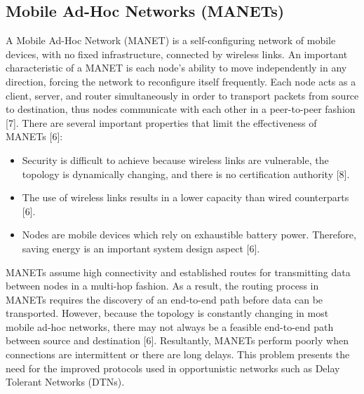 \documentclass{article}
\begin{document}
\subsection{Mobile Ad-Hoc Networks (MANETs)}
A Mobile Ad-Hoc Network (MANET) is a self-configuring network of mobile devices, with no fixed infrastructure, connected by wireless links. An important characteristic of a MANET is each node's ability to move independently in any direction, forcing the network to reconfigure itself frequently. Each node acts as a client, server, and router simultaneously in order to transport packets from source to destination, thus nodes communicate with each other in a peer-to-peer fashion [7]. There are several important properties that limit the effectiveness of MANETs [6]:
\begin{itemize}
	\item Security is difficult to achieve because wireless links are vulnerable, the topology is dynamically changing, and there is no certification authority [8].
	\item The use of wireless links results in a lower capacity than wired counterparts [6].
	\item Nodes are mobile devices which rely on exhaustible battery power. Therefore, saving energy is an important system design aspect [6].
\end{itemize}
MANETs assume high connectivity and established routes for transmitting data between nodes in a multi-hop fashion. As a result, the routing process in MANETs requires the discovery of an end-to-end path before data can be transported. However, because the topology is constantly changing in most mobile ad-hoc networks, there may not always be a feasible end-to-end path between source and destination [6]. Resultantly, MANETs perform poorly when connections are intermittent or there are long delays. This problem presents the need for the improved protocols used in opportunistic networks such as Delay Tolerant Networks (DTNs).
\end{document}

